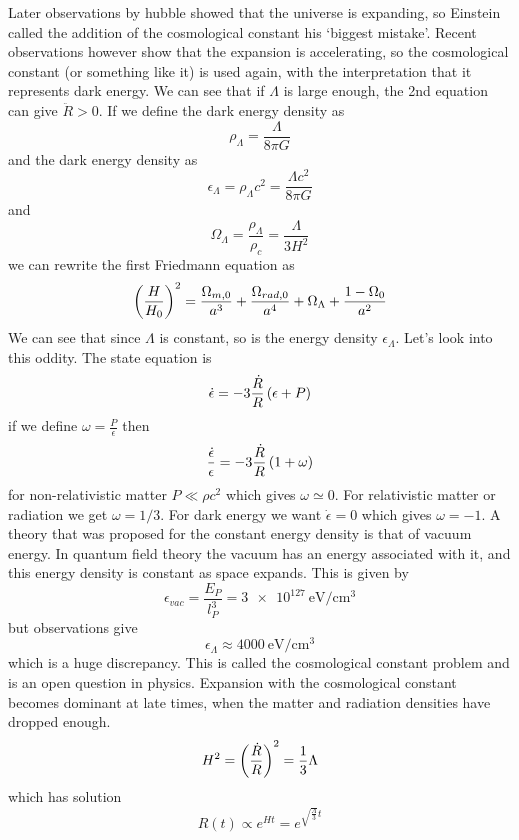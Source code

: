 Later observations by hubble showed that the universe is expanding, so Einstein called the addition of the cosmological constant his `biggest mistake'. Recent observations however show that the expansion is accelerating, so the cosmological constant (or something like it) is used again, with the interpretation that it represents dark energy. We can see that if \(\Lambda\) is large enough, the 2nd equation can give \(\ddot{R} > 0\). If we define the dark energy density as
\begin{equation}
    \rho_\Lambda = \frac{\Lambda}{8\pi G}
\end{equation}
and the dark energy density as
\begin{equation}
    \epsilon_\Lambda = \rho_\Lambda c^2 = \frac{\Lambda c^2}{8\pi G}
\end{equation}
and 
\begin{equation}
    \Omega_\Lambda = \frac{\rho_\Lambda}{\rho_c} = \frac{\Lambda}{3H^2}
\end{equation}
we can rewrite the first Friedmann equation as
\begin{equation}
    \left(\frac{H}{H_0}\right)^2 = \frac{\Omega_{m,0}}{a^3} + \frac{\Omega_{rad,0}}{a^4} + \Omega_{\Lambda} + \frac{1-\Omega_0}{a^2}
\end{equation}
We can see that since \(\Lambda\) is constant, so is the energy density \(\epsilon_\Lambda\). Let's look into this oddity. The state equation is
\begin{equation}
    \dot{\epsilon} = -3\frac{\dot{R}}{R}\left(\epsilon + P\right)
\end{equation}
if we define \(\omega = \frac{P}{\epsilon}\) then
\begin{equation}
    \frac{\dot{\epsilon}}{\epsilon} = -3\frac{\dot{R}}{R}\left(1+\omega\right)
\end{equation}
for non-relativistic matter \(P \ll \rho c^2\) which gives \(\omega \simeq 0\). For relativistic matter or radiation we get \(\omega = 1/3\). For dark energy we want \(\dot{\epsilon} = 0\) which gives \(\omega = -1\). A theory that was proposed for the constant energy density is that of vacuum energy. In quantum field theory the vacuum has an energy associated with it, and this energy density is constant as space expands. This is given by
\begin{equation}
    \epsilon_{vac} = \frac{E_P}{l_P^3} = \qty{3e127}{\electronvolt\per\centi\meter\cubed}
\end{equation}
but observations give
\begin{equation}
    \epsilon_\Lambda \approx \qty{4000}{\electronvolt\per\centi\meter\cubed}
\end{equation}
which is a huge discrepancy. This is called the cosmological constant problem and is an open question in physics. Expansion with the cosmological constant becomes dominant at late times, when the matter and radiation densities have dropped enough.
\begin{equation}
    H^2 = \left(\frac{\dot{R}}{R}\right)^2 = \frac{1}{3}\Lambda
\end{equation}
which has solution
\begin{equation}
    R(t) \propto e^{Ht} = e^{\sqrt{\frac{\Lambda}{3}}t}
\end{equation}